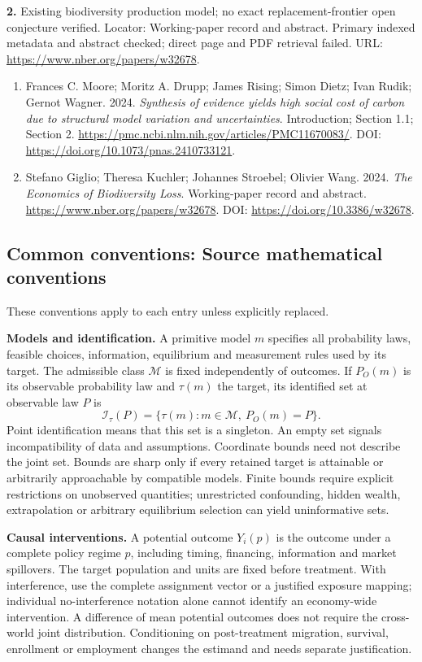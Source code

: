 \documentclass[11pt,a4paper]{article}
\begin{document}
\textbf{2.} Existing biodiversity production model; no exact replacement-frontier open conjecture verified. Locator: Working-paper record and abstract. Primary indexed metadata and abstract checked; direct page and PDF retrieval failed. URL: \url{https://www.nber.org/papers/w32678}.
\begin{enumerate}\raggedright
\item\hypertarget{definitions:source:30007714:1}{} Frances C. Moore; Moritz A. Drupp; James Rising; Simon Dietz; Ivan Rudik; Gernot Wagner. 2024. \emph{Synthesis of evidence yields high social cost of carbon due to structural model variation and uncertainties}. Introduction; Section 1.1; Section 2.
\url{https://pmc.ncbi.nlm.nih.gov/articles/PMC11670083/}.
DOI: \url{https://doi.org/10.1073/pnas.2410733121}.
\item\hypertarget{definitions:source:30007714:2}{} Stefano Giglio; Theresa Kuchler; Johannes Stroebel; Olivier Wang. 2024. \emph{The Economics of Biodiversity Loss}. Working-paper record and abstract.
\url{https://www.nber.org/papers/w32678}.
DOI: \url{https://doi.org/10.3386/w32678}.
\end{enumerate}

\subsection*{Common conventions: Source mathematical conventions}

These conventions apply to each entry unless explicitly replaced.

\textbf{Models and identification.} A primitive model \(m\) specifies all probability laws, feasible choices, information, equilibrium and measurement rules used by its target. The admissible class \(\mathcal M\) is fixed independently of outcomes. If \(P_O(m)\) is its observable probability law and \(\tau(m)\) the target, its identified set at observable law \(P\) is
\[
 \mathcal I_\tau(P)=\{\tau(m):m\in\mathcal M,\ P_O(m)=P\}.
\]
Point identification means that this set is a singleton. An empty set signals incompatibility of data and assumptions. Coordinate bounds need not describe the joint set. Bounds are sharp only if every retained target is attainable or arbitrarily approachable by compatible models. Finite bounds require explicit restrictions on unobserved quantities; unrestricted confounding, hidden wealth, extrapolation or arbitrary equilibrium selection can yield uninformative sets.

\textbf{Causal interventions.} A potential outcome \(Y_i(p)\) is the outcome under a complete policy regime \(p\), including timing, financing, information and market spillovers. The target population and units are fixed before treatment. With interference, use the complete assignment vector or a justified exposure mapping; individual no-interference notation alone cannot identify an economy-wide intervention. A difference of mean potential outcomes does not require the cross-world joint distribution. Conditioning on post-treatment migration, survival, enrollment or employment changes the estimand and needs separate justification.
\end{document}

